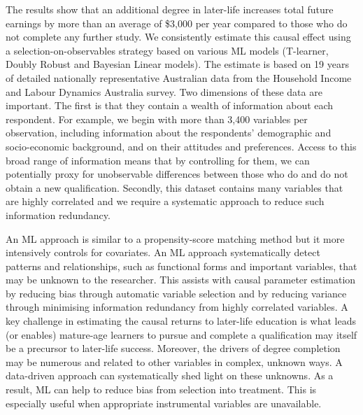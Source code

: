 \documentclass[12pt, a4paper]{article}
\begin{document}
The results show that an additional degree in later-life increases total future earnings by more than an average of \$3,000 per year compared to those who do not complete any further study. We consistently estimate this causal effect using a selection-on-observables strategy based on various ML models (T-learner, Doubly Robust and Bayesian Linear models). The estimate is based on 19 years of detailed nationally representative Australian data from the Household Income and Labour Dynamics Australia survey. Two dimensions of these data are important. The first is that they contain a wealth of information about each respondent. For example, we begin with more than 3,400 variables per observation, including information about the respondents' demographic and socio-economic background, and on their attitudes and preferences. Access to this broad range of information means that by controlling for them, we can potentially proxy for unobservable differences between those who do and do not obtain a new qualification. Secondly, this dataset contains many variables that are highly correlated and we require a systematic approach to reduce such information redundancy.

An ML approach is similar to a propensity-score matching method but it more intensively controls for covariates. An ML approach systematically detect patterns and relationships, such as functional forms and important variables, that may be unknown to the researcher. This assists with causal parameter estimation by reducing bias through automatic variable selection and by reducing variance through minimising information redundancy from highly correlated variables. A key challenge in estimating the causal returns to later-life education is what leads (or enables) mature-age learners to pursue and complete a qualification may itself be a precursor to later-life success. Moreover, the drivers of degree completion may be numerous and related to other variables in complex, unknown ways. A data-driven approach can systematically shed light on these unknowns. As a result, ML can help to reduce bias from selection into treatment. This is especially useful when appropriate instrumental variables are unavailable.
\end{document}
